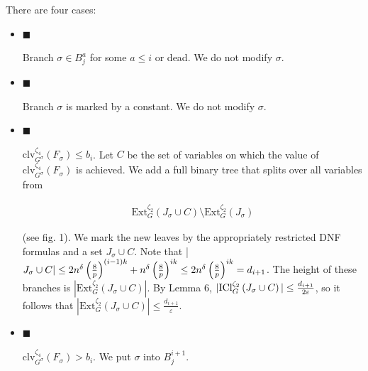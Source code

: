 \documentclass[10pt,a4paper]{article}
\begin{document}
There are four cases:\par


\begin{itemize}


\item[] 
$\blacksquare$ 


Branch $\sigma\in B^{a}_{j}$ for some $a\leq i$ or dead. We do not modify $\sigma$.\par





\item[] 
$\blacksquare$ 


Branch $\sigma$ is marked by a constant. We do not modify $\sigma$.\par





\item[] 
$\blacksquare$ 


$\mathrm{clv}_{G^{\sigma}}^{\zeta_{4}}\left(F_{\sigma}\right)\leq b_{i}$. Let $C$ be the set of variables on
which the value of $\mathrm{clv}_{G^{\sigma}}^{\zeta_{4}}\left(F_{\sigma}\right)$
is achieved. We add a full binary tree that splits
over all variables from\par


\[\begin{gathered}
\mathrm{Ext}_{G}^{\zeta_{2}}\left(J_{\sigma}\cup C\right)\setminus\mathrm{Ext}%
_{G}^{\zeta_{2}}\left(J_{\sigma}\right)
\end{gathered}\]


(see fig. 1). We mark the new leaves by the appropriately restricted DNF formulas and a set $J_{\sigma}\cup C$. Note that |$J_{\sigma}\cup C|\leq 2n^{\delta}\left(\frac{8}{p}\right)^{(i-1)k}+n^{\delta}%
\left(\frac{8}{p}\right)^{ik}\leq 2n^{\delta}\left(\frac{8}{p}\right)^{ik}=d_{%
i+1}$. The height of these branches is $|\mathrm{Ext}_{G}^{\zeta_{2}}\left(J_{\sigma}\cup C\right)|$. By Lemma 6, $|\mathrm{ICl}_{G}^{\zeta_{2}}\left(J_{\sigma}\cup C\right)|\leq\frac{d_{i+1}}{%
2\varepsilon}$, so it follows that $|\mathrm{Ext}_{G}^{\zeta_{2}}\left(J_{\sigma}\cup C\right)|\leq\frac{d_{i+1}}{\varepsilon}$.\par





\item[] 
$\blacksquare$ 


$\mathrm{clv}_{G^{\sigma}}^{\zeta_{4}}\left(F_{\sigma}\right)>b_{i}$. We put $\sigma$ into $B^{i+1}_{j}$.\par





\end{itemize}
\end{document}
